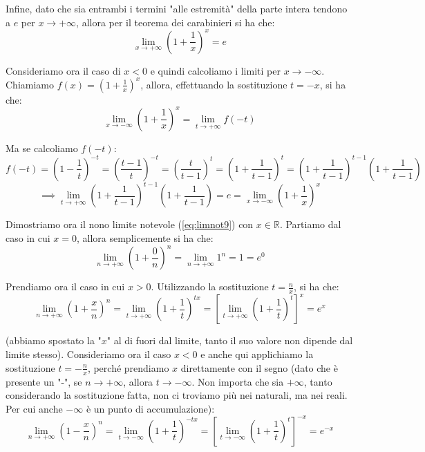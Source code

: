 \documentclass{article}
\begin{document}
\noindent Infine, dato che sia entrambi i termini "alle estremità" della parte intera tendono a $e$ per $x \to +\infty$, allora per il teorema dei carabinieri si ha che:
\begin{equation*}
    \lim_{x \to +\infty} \left(1 + \frac{1}{x}\right)^x = e
\end{equation*}

\noindent Consideriamo ora il caso di $x < 0$ e quindi calcoliamo i limiti per $x \to -\infty$. Chiamiamo $f(x) = (1 + \frac{1}{x})^x$, allora, effettuando la sostituzione $t = -x$, si ha che:
\begin{equation*}
    \lim_{x \to -\infty} \left(1 + \frac{1}{x}\right)^x = \lim_{t \to +\infty} f(-t)
\end{equation*}

\noindent Ma se calcoliamo $f(-t)$:
\begin{equation*}
    f(-t) = \left(1 - \frac{1}{t}\right)^{-t} = \left(\frac{t - 1}{t}\right)^{-t} = \left(\frac{t}{t - 1}\right)^t = \left(1 + \frac{1}{t - 1}\right)^t = \left(1 + \frac{1}{t - 1}\right)^{t-1}\left(1 + \frac{1}{t - 1}\right)
\end{equation*}
\begin{equation*}
    \implies \lim_{t \to +\infty} \left(1 + \frac{1}{t - 1}\right)^{t-1}\left(1 + \frac{1}{t - 1}\right) = e = \lim_{x \to -\infty} \left(1 + \frac{1}{x}\right)^x
\end{equation*}

\noindent Dimostriamo ora il nono limite notevole (\ref{eq:limnot9}) con $x \in \mathbb{R}$. Partiamo dal caso in cui $x = 0$, allora semplicemente si ha che:
\begin{equation*}
    \lim_{n \to +\infty} \left(1 + \frac{0}{n}\right)^n =  \lim_{n \to +\infty} 1^n = 1 = e^0
\end{equation*}

\noindent Prendiamo ora il caso in cui $x > 0$. Utilizzando la sostituzione $t = \frac{n}{x}$, si ha che:
\begin{equation*}
    \lim_{n \to +\infty} \left(1 + \frac{x}{n}\right)^n = \lim_{t \to +\infty} \left(1 + \frac{1}{t}\right)^{tx} = \left[\lim_{t \to +\infty} \left(1 + \frac{1}{t}\right)^t\right]^x = e^x
\end{equation*}

\noindent (abbiamo spostato la "$x$" al di fuori dal limite, tanto il suo valore non dipende dal limite stesso). Consideriamo ora il caso $x < 0$ e anche qui applichiamo la sostituzione $t = -\frac{n}{x}$, perché prendiamo $x$ direttamente con il segno (dato che è presente un "-", se $n \to +\infty$, allora $t \to -\infty$. Non importa che sia $+\infty$, tanto considerando la sostituzione fatta, non ci troviamo più nei naturali, ma nei reali. Per cui anche $-\infty$ è un punto di accumulazione):
\begin{equation*}
    \lim_{n \to +\infty} \left(1 - \frac{x}{n}\right)^n = \lim_{t \to -\infty} \left(1 + \frac{1}{t}\right)^{-tx} = \left[\lim_{t \to -\infty} \left(1 + \frac{1}{t}\right)^t\right]^{-x} = e^{-x}
\end{equation*}
\end{document}
